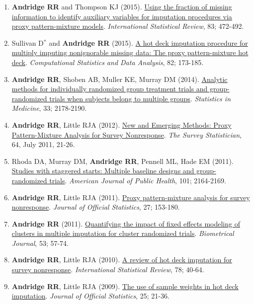 \documentclass[
  english,
  letterpaper,
  DIV=11,
  numbers=noendperiod]{scrartcl}
\begin{document}
\begin{enumerate}
  \emph{Annals of Applied Statistics}, 9; 2237-2265.
\item
  \textbf{Andridge RR} and Thompson KJ (2015).
  \href{https://doi.org/10.1111/insr.12091}{Using the fraction of
  missing information to identify auxiliary variables for imputation
  procedures via proxy pattern-mixture models}. \emph{International
  Statistical Review}, 83; 472-492.
\item
  Sullivan D\(^*\) and \textbf{Andridge RR} (2015).
  \href{https://doi.org/10.1016/j.csda.2014.09.008}{A hot deck
  imputation procedure for multiply imputing nonignorable missing data:
  The proxy pattern-mixture hot deck}. \emph{Computational Statistics
  and Data Analysis}, 82; 173-185.
\item
  \textbf{Andridge RR}, Shoben AB, Muller KE, Murray DM (2014).
  \href{https://doi.org/10.1002/sim.6083}{Analytic methods for
  individually randomized group treatment trials and group-randomized
  trials when subjects belong to multiple groups}. \emph{Statistics in
  Medicine}, 33; 2178-2190.
\item
  \textbf{Andridge RR}, Little RJA (2012).
  \href{https://isi-iass.org/home/wp-content/uploads/N64.pdf}{New and
  Emerging Methods: Proxy Pattern-Mixture Analysis for Survey
  Nonresponse}. \emph{The Survey Statistician}, 64, July 2011, 21-26.
\item
  Rhoda DA, Murray DM, \textbf{Andridge RR}, Pennell ML, Hade EM (2011).
  \href{https://doi.org/10.2105/AJPH.2011.300264}{Studies with staggered
  starts: Multiple baseline designs and group-randomized trials}.
  \emph{American Journal of Public Health}, 101; 2164-2169.
\item
  \textbf{Andridge RR}, Little RJA (2011).
  \href{https://www.scb.se/contentassets/ca21efb41fee47d293bbee5bf7be7fb3/proxy-pattern-mixture-analysis-for-survey-nonresponse.pdf}{Proxy
  pattern-mixture analysis for survey nonresponse}. \emph{Journal of
  Official Statistics}, 27; 153-180.
\item
  \textbf{Andridge RR} (2011).
  \href{https://doi.org/10.1002/bimj.201000140}{Quantifying the impact
  of fixed effects modeling of clusters in multiple imputation for
  cluster randomized trials}. \emph{Biometrical Journal}, 53; 57-74.
\item
  \textbf{Andridge RR}, Little RJA (2010).
  \href{https://doi.org/10.1111/j.1751-5823.2010.00103.x}{A review of
  hot deck imputation for survey nonresponse}. \emph{International
  Statistical Review}, 78; 40-64.
\item
  \textbf{Andridge RR}, Little RJA (2009).
  \href{https://www.ncbi.nlm.nih.gov/pmc/articles/PMC3117228/}{The use
  of sample weights in hot deck imputation}. \emph{Journal of Official
  Statistics}, 25; 21-36.
\end{enumerate}
\end{document}
